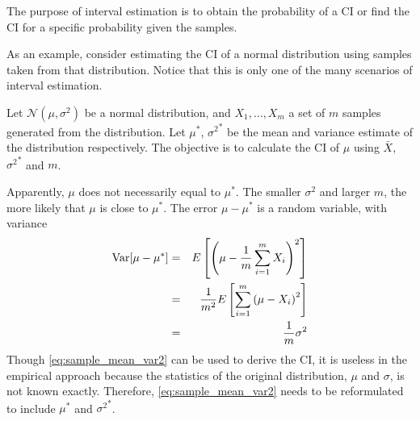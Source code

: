 The purpose of interval estimation is to obtain the probability of a CI or find the CI for a specific probability given the samples.

As an example, consider estimating the CI of a normal distribution using samples taken from that distribution. Notice that this is only one of the many scenarios of interval estimation.

Let $\mathcal{N}(\mu,\sigma^2)$ be a normal distribution, and $X_1, \ldots, X_m$ a set of $m$ samples generated from the distribution. Let $\mu^*$, ${\sigma^2}^*$ be the mean and variance estimate of the distribution respectively. The objective is to calculate the CI of $\mu$ using $\bar{X}$, ${\sigma^2}^*$ and $m$.

Apparently, $\mu$ does not necessarily equal to $\mu^*$. The smaller $\sigma^2$ and larger $m$, the more likely that $\mu$ is close to $\mu^*$. The error $\mu - \mu^*$ is a random variable, with variance
\begin{eqnarray}
	\textup{Var}[\mu-\mu^*] &=& E\left[\left(\mu-\dfrac{1}{m}\sum_{i=1}^{m} X_i\right)^2\right] \nonumber \\
	&=& \dfrac{1}{m^2}E\left[\sum_{i=1}^{m}\left(\mu-X_i\right)^2\right] \label{eq:sample_mean_var1} \\
	&=& \dfrac{1}{m}\sigma^2 \label{eq:sample_mean_var2}
\end{eqnarray}
Though \eqref{eq:sample_mean_var2} can be used to derive the CI, it is useless in the empirical approach because the statistics of the original distribution, $\mu$ and $\sigma$, is not known exactly. Therefore, \eqref{eq:sample_mean_var2} needs to be reformulated to include $\mu^*$ and ${\sigma^2}^*$.

